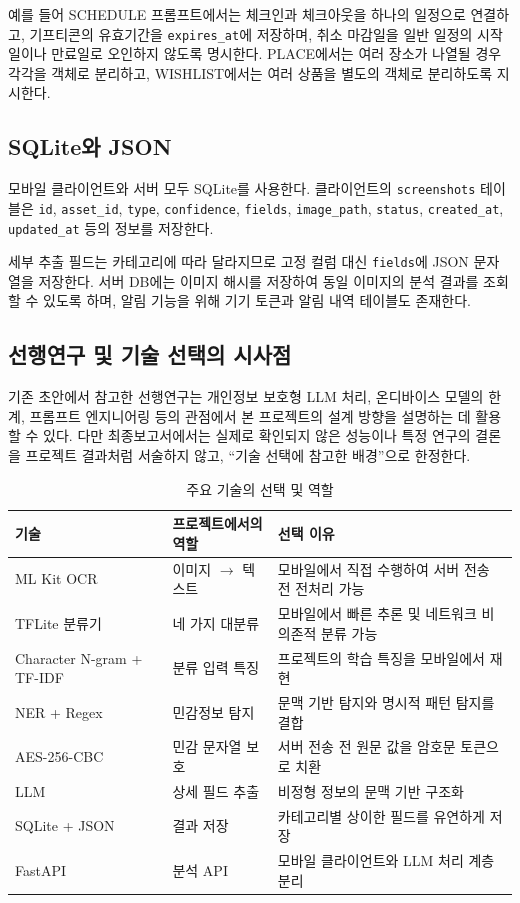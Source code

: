 \documentclass[11pt,a4paper]{article}
\begin{document}
예를 들어 SCHEDULE 프롬프트에서는 체크인과 체크아웃을 하나의 일정으로 연결하고, 기프티콘의 유효기간을 \texttt{expires\_at}에 저장하며, 취소 마감일을 일반 일정의 시작일이나 만료일로 오인하지 않도록 명시한다. PLACE에서는 여러 장소가 나열될 경우 각각을 객체로 분리하고, WISHLIST에서는 여러 상품을 별도의 객체로 분리하도록 지시한다.

\subsection{SQLite와 JSON}

모바일 클라이언트와 서버 모두 SQLite를 사용한다. 클라이언트의 \texttt{screenshots} 테이블은 \texttt{id}, \texttt{asset\_id}, \texttt{type}, \texttt{confidence}, \texttt{fields}, \texttt{image\_path}, \texttt{status}, \texttt{created\_at}, \texttt{updated\_at} 등의 정보를 저장한다.

세부 추출 필드는 카테고리에 따라 달라지므로 고정 컬럼 대신 \texttt{fields}에 JSON 문자열을 저장한다. 서버 DB에는 이미지 해시를 저장하여 동일 이미지의 분석 결과를 조회할 수 있도록 하며, 알림 기능을 위해 기기 토큰과 알림 내역 테이블도 존재한다.

\subsection{선행연구 및 기술 선택의 시사점}

기존 초안에서 참고한 선행연구는 개인정보 보호형 LLM 처리, 온디바이스 모델의 한계, 프롬프트 엔지니어링 등의 관점에서 본 프로젝트의 설계 방향을 설명하는 데 활용할 수 있다. 다만 최종보고서에서는 실제로 확인되지 않은 성능이나 특정 연구의 결론을 프로젝트 결과처럼 서술하지 않고, ``기술 선택에 참고한 배경''으로 한정한다.

\begin{table}[H]
\centering
\small
\begin{tabularx}{\linewidth}{p{3.0cm}Y Y}
\toprule
\textbf{기술} & \textbf{프로젝트에서의 역할} & \textbf{선택 이유}\\
\midrule
ML Kit OCR & 이미지 $\rightarrow$ 텍스트 & 모바일에서 직접 수행하여 서버 전송 전 전처리 가능\\
TFLite 분류기 & 네 가지 대분류 & 모바일에서 빠른 추론 및 네트워크 비의존적 분류 가능\\
Character N-gram + TF-IDF & 분류 입력 특징 & 프로젝트의 학습 특징을 모바일에서 재현\\
NER + Regex & 민감정보 탐지 & 문맥 기반 탐지와 명시적 패턴 탐지를 결합\\
AES-256-CBC & 민감 문자열 보호 & 서버 전송 전 원문 값을 암호문 토큰으로 치환\\
LLM & 상세 필드 추출 & 비정형 정보의 문맥 기반 구조화\\
SQLite + JSON & 결과 저장 & 카테고리별 상이한 필드를 유연하게 저장\\
FastAPI & 분석 API & 모바일 클라이언트와 LLM 처리 계층 분리\\
\bottomrule
\end{tabularx}
\caption{주요 기술의 선택 및 역할}
\end{table}
\end{document}
